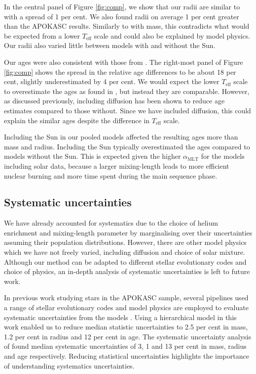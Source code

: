 \documentclass[a4paper,fleqn,usenatbib]{mnras}
\newcommand{\teff}{\ensuremath{T_\mathrm{eff}}}
\newcommand{\mlt}{\ensuremath{{\alpha_\mathrm{MLT}}}}
\begin{document}
In the central panel of Figure \ref{fig:comp}, we show that our radii are similar to  with a spread of 1 per cent. We also found radii on average 1 per cent greater than the APOKASC results. Similarly to with mass, this contradicts what would be expected from a lower $\teff$ scale and could also be explained by model physics. Our radii also varied little between models with and without the Sun.

Our ages were also consistent with those from . The right-most panel of Figure \ref{fig:comp} shows the spread in the relative age differences to be about 18 per cent, slightly underestimated by 4 per cent. We would expect the lower $\teff$ scale to overestimate the ages as found in , but instead they are comparable. However, as discussed previously, including diffusion has been shown to reduce age estimates compared to those without. Since we have included diffusion, this could explain the similar ages despite the difference in $\teff$ scale.

Including the Sun in our pooled models affected the resulting ages more than mass and radius. Including the Sun typically overestimated the ages compared to models without the Sun. This is expected given the higher $\mlt$ for the models including solar data, because a larger mixing-length leads to more efficient nuclear burning and more time spent during the main sequence phase. 

\subsection{Systematic uncertainties}\label{sec:sys}

We have already accounted for systematics due to the choice of helium enrichment and mixing-length parameter by marginalising over their uncertainties assuming their population distributions. However, there are other model physics which we have not freely varied, including diffusion and choice of solar mixture. Although our method can be adapted to different stellar evolutionary codes and choice of physics, an in-depth analysis of systematic uncertainties is left to future work. 

In previous work studying stars in the APOKASC sample, several pipelines used a range of stellar evolutionary codes and model physics are employed to evaluate systematic uncertainties from the models \citep{Serenelli.Johnson.ea2017, SilvaAguirre.Lund.ea2017}. Using a hierarchical model in this work enabled us to reduce median statistic uncertainties to 2.5 per cent in mass, 1.2 per cent in radius and 12 per cent in age. The systematic uncertainty analysis of  found median systematic uncertainties of 3, 1 and 13 per cent in mass, radius and age respectively. Reducing statistical uncertainties highlights the importance of understanding systematics uncertainties.
\end{document}

